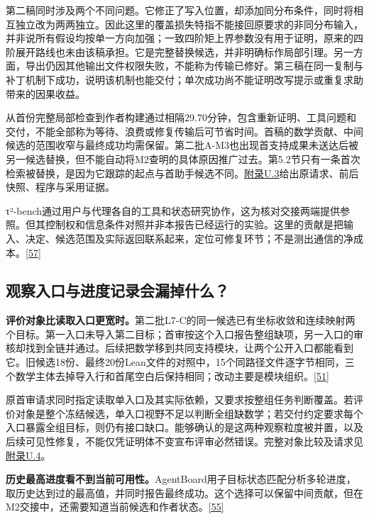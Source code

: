 第二稿同时涉及两个不同问题。它修正了写入位置，却添加同分布条件，同时将相互独立改为两两独立。因此这里的覆盖损失特指不能接回原要求的非同分布输入，并非说所有假设均按单一方向加强；一致四阶矩上界参数没有用于证明，原来的四阶展开路线也未由该稿承担。它是完整替换候选，并非明确标作局部引理。另一方面，导出仍因其他输出文件权限失败，不能称为传输已修好。第三稿在同一复制与补丁机制下成功，说明该机制也能交付；单次成功尚不能证明改写提示或重复求助带来的因果收益。

从首份完整局部检查到作者构建通过相隔29.70分钟，包含重新证明、工具问题和交付，不能全部称为等待、浪费或修复传输后可节省时间。首稿的数学贡献、中间候选的范围收窄与最终成功均需保留。第二批A-M3也出现首支持成果未送达后被另一候选替换，但不能自动将M2查明的具体原因推广过去。第5.2节只有一条首次检索被替换，是因为它跟踪的起点与首助手候选不同。\href{zh-appendix.pdf\#u3}{附录U.3}给出原请求、前后快照、程序与采用证据。

τ²-bench通过用户与代理各自的工具和状态研究协作，这为核对交接两端提供参照。但其控制权和信息条件对照并非本报告已经运行的实验。这里的贡献是把输入、决定、候选范围及实际返回联系起来，定位可修复环节；不是测出通信的净成本。\hyperlink{ref-57}{\mbox{[57]}}

\subsection[观察入口与进度记录会漏掉什么？]{\texorpdfstring{\protect\hypertarget{section-5-5}{}观察入口与进度记录会漏掉什么？}{观察入口与进度记录会漏掉什么？}}
\textbf{评价对象比读取入口更宽时。}第二批L7-C的同一候选已有坐标收敛和连续映射两个目标。第一入口未导入第二目标；首审按这个入口报告整组缺项，另一入口的审核却找到全链并通过。后续把数学移到共同支持模块，让两个公开入口都能看到它。旧候选18份、最终20份Lean文件的对照中，15个同路径文件逐字节相同，三个数学主体去掉导入行和首尾空白后保持相同；改动主要是模块组织。\hyperlink{ref-51}{\mbox{[51]}}

原首审请求同时指定读取单入口及其实际依赖，又要求按整组任务判断覆盖。若评价对象是整个冻结候选，单入口视野不足以判断全组缺数学；若交付约定要求每个入口暴露全组目标，则仍有接口缺口。能够确认的是这两种观察粒度被并置，以及后续可见性修复，不能仅凭证明体不变宣布评审必然错误。完整对象比较及请求见\href{zh-appendix.pdf\#u4}{附录U.4}。

\textbf{历史最高进度看不到当前可用性。}AgentBoard用子目标状态匹配分析多轮进度，取历史达到过的最高值，并同时报告最终成功。这个选择可以保留中间贡献，但在M2交接中，还需要知道当前候选和作者状态。\hyperlink{ref-55}{\mbox{[55]}}

